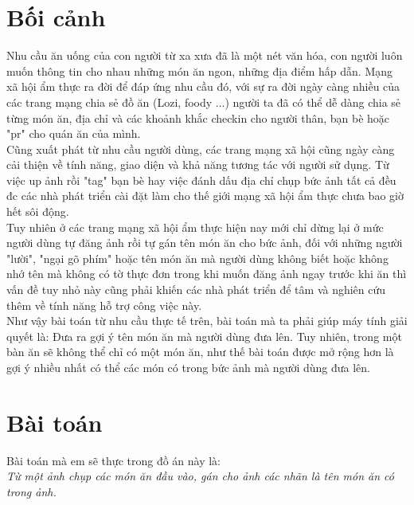 \documentclass[13pt, a4paper]{extreport}
\begin{document}
\section{Bối cảnh}
\indent Nhu cầu ăn uống của con người từ xa xưa đã là một nét văn hóa, con người luôn muốn thông tin cho nhau những món ăn ngon, những địa điểm hấp dẫn. Mạng xã hội ẩm thực ra đời để đáp ứng nhu cầu đó, với sự ra đời ngày càng nhiều của các trang mạng chia sẻ đồ ăn (Lozi, foody ...) người ta đã có thể dễ dàng chia sẻ từng món ăn, địa chỉ và các khoảnh khắc checkin cho người thân, bạn bè hoặc "pr" cho quán ăn của mình.\\
\indent Cũng xuất phát từ nhu cầu người dùng, các trang mạng xã hội cũng ngày càng cải thiện về tính năng, giao diện và khả năng tương tác với người sử dụng. Từ việc up ảnh rồi "tag" bạn bè hay việc đánh dấu địa chỉ chụp bức ảnh tất cả đều đc các nhà phát triển cài đặt làm cho thế giới mạng xã hội ẩm thực chưa bao giờ hết sôi động.\\
\indent Tuy nhiên ở các trang mạng xã hội ẩm thực hiện nay mới chỉ dừng lại ở mức người dùng tự đăng ảnh rồi tự gán tên món ăn cho bức ảnh, đối với những người "lười", "ngại gõ phím" hoặc tên món ăn mà người dùng không biết hoặc không nhớ tên mà không có tờ thực đơn trong khi muốn đăng ảnh ngay trước khi ăn thì vấn đề tuy nhỏ này cũng phải khiến các nhà phát triển để tâm và nghiên cứu thêm về tính năng hỗ trợ công việc này.\\
\indent Như vậy bài toán từ nhu cầu thực tế trên, bài toán mà ta phải giúp máy tính giải quyết là: Đưa ra gợi ý tên món ăn mà người dùng đưa lên. Tuy nhiên, trong một bàn ăn sẽ không thể chỉ có một món ăn, như thế bài toán được mở rộng hơn là gợi ý nhiều nhất có thể các món có trong bức ảnh mà người dùng đưa lên.
\section{Bài toán}
\indent Bài toán mà em sẽ thực trong đồ án này là:\\
\indent \textit{Từ một ảnh chụp các món ăn đầu vào, gán cho ảnh các nhãn là tên món ăn có trong ảnh.}
\end{document}
